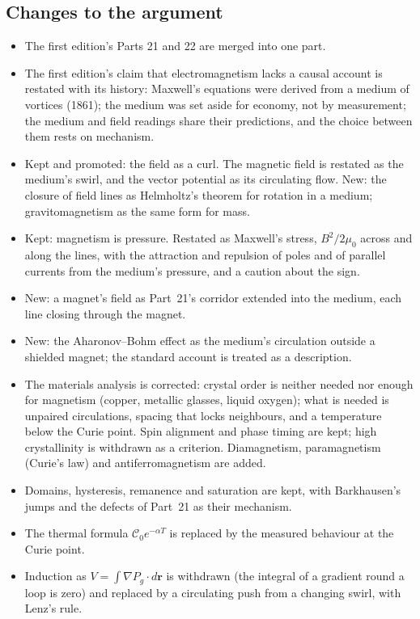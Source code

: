 \documentclass[11pt,a4paper]{article}
\begin{document}
\subsection*{Changes to the argument}
\begin{itemize}
\item The first edition's Parts 21 and 22 are merged into one part.
\item The first edition's claim that electromagnetism lacks a causal account is restated with its history: Maxwell's equations were derived from a medium of vortices (1861); the medium was set aside for economy, not by measurement; the medium and field readings share their predictions, and the choice between them rests on mechanism.
\item Kept and promoted: the field as a curl. The magnetic field is restated as the medium's swirl, and the vector potential as its circulating flow. New: the closure of field lines as Helmholtz's theorem for rotation in a medium; gravitomagnetism as the same form for mass.
\item Kept: magnetism is pressure. Restated as Maxwell's stress, $B^2/2\mu_0$ across and along the lines, with the attraction and repulsion of poles and of parallel currents from the medium's pressure, and a caution about the sign.
\item New: a magnet's field as Part~21's corridor extended into the medium, each line closing through the magnet.
\item New: the Aharonov--Bohm effect as the medium's circulation outside a shielded magnet; the standard account is treated as a description.
\item The materials analysis is corrected: crystal order is neither needed nor enough for magnetism (copper, metallic glasses, liquid oxygen); what is needed is unpaired circulations, spacing that locks neighbours, and a temperature below the Curie point. Spin alignment and phase timing are kept; high crystallinity is withdrawn as a criterion. Diamagnetism, paramagnetism (Curie's law) and antiferromagnetism are added.
\item Domains, hysteresis, remanence and saturation are kept, with Barkhausen's jumps and the defects of Part~21 as their mechanism.
\item The thermal formula $\mathcal{C}_0e^{-\alpha T}$ is replaced by the measured behaviour at the Curie point.
\item Induction as $V=\int\nabla P_g\cdot d\mathbf{r}$ is withdrawn (the integral of a gradient round a loop is zero) and replaced by a circulating push from a changing swirl, with Lenz's rule.

\end{itemize}
\end{document}
